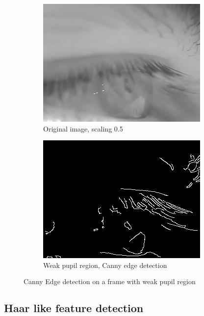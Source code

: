 \begin{figure}[ht]
    \centering
    \begin{subfigure}{.5\textwidth}
      \centering
      \includegraphics[width=.9\linewidth]{plots/orig_canny_eyelids.png}
      \caption{Original image, scaling 0.5}
      \label{fig:orig_canny_lids}
    \end{subfigure}%
    \begin{subfigure}{.5\textwidth}
      \centering
      \includegraphics[width=.9\linewidth]{plots/canny_eyelids.png}
      \caption{Weak pupil region, Canny edge detection}
      \label{fig:canny_eyelid}
    \end{subfigure}
    \caption{Canny Edge detection on a frame with weak pupil region}
    \label{fig:canny_eyelid}
\end{figure}

\subsection{Haar like feature detection}
